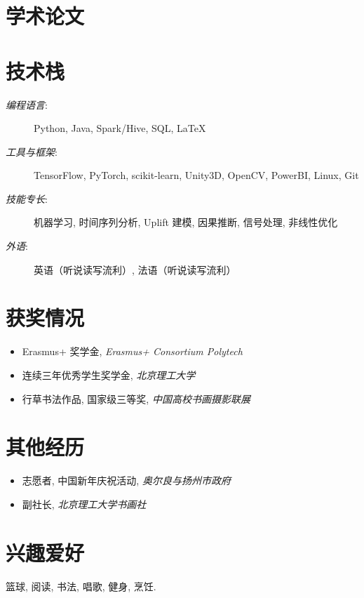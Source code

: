 \documentclass{mycv}
\begin{document}
\section{学术论文}


\vspace{-\parskip}

\section{技术栈}

\begin{description}
  \item[\textit{编程语言}:] Python, Java, Spark/Hive, SQL, \LaTeX
  \item[\textit{工具与框架}:] TensorFlow, PyTorch, scikit-learn, Unity3D, OpenCV, PowerBI, Linux, Git
  \item[\textit{技能专长}:] 机器学习, 时间序列分析, Uplift 建模, 因果推断, 信号处理, 非线性优化
  \item[\textit{外语}:] 英语（听说读写流利）, 法语（听说读写流利）
\end{description}

\vspace{-\parskip}

\section{获奖情况}

\begin{itemize}
  \item Erasmus+ 奖学金, \textit{Erasmus+ Consortium Polytech} 
  \item 连续三年优秀学生奖学金, \textit{北京理工大学} 
  \item 行草书法作品, 国家级三等奖, \textit{中国高校书画摄影联展} 
\end{itemize}

\vspace{-\parskip}

\section{其他经历}
\begin{itemize}
  \item 志愿者, 中国新年庆祝活动, \emph{奥尔良与扬州市政府} 
  \item 副社长, \emph{北京理工大学书画社} 
\end{itemize}

\section{兴趣爱好}
篮球, 阅读, 书法, 唱歌, 健身, 烹饪.

\end{document}
